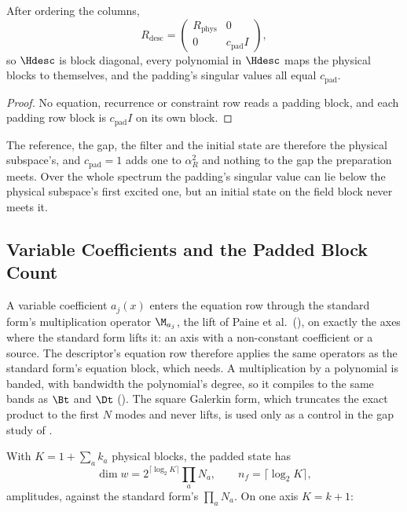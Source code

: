\begin{proposition}
\label{prop:padding-decouples}
After ordering the columns,
\begin{equation*}
    R_{\mathrm{desc}}=\begin{pmatrix}R_{\mathrm{phys}}&0\\0&c_{\mathrm{pad}}I\end{pmatrix},
\end{equation*}
so $\Hdesc$ is block diagonal, every polynomial in $\Hdesc$ maps the physical blocks to themselves, and the padding's singular values all equal $c_{\mathrm{pad}}$.
\end{proposition}
\begin{proof}
No equation, recurrence or constraint row reads a padding block, and each padding row block is $c_{\mathrm{pad}}I$ on its own block.
\end{proof}

The reference, the gap, the filter and the initial state are therefore the physical subspace's, and $c_{\mathrm{pad}}=1$ adds one to $\alpha_R^2$ and nothing to the gap the preparation meets. Over the whole spectrum the padding's singular value can lie below the physical subspace's first excited one, but an initial state on the field block never meets it.

\subsection{Variable Coefficients and the Padded Block Count}
\label{sec:app-variable-coeff}

A variable coefficient $a_j(x)$ enters the equation row through the standard form's multiplication operator $\M_{a_j}$, the lift of Paine et al.\ (), on exactly the axes where the standard form lifts it: an axis with a non-constant coefficient or a source. The descriptor's equation row therefore applies the same operators as the standard form's equation block, which  needs. A multiplication by a polynomial is banded, with bandwidth the polynomial's degree, so it compiles to the same bands as $\Bt$ and $\Dt$ (). The square Galerkin form, which truncates the exact product to the first $N$ modes and never lifts, is used only as a control in the gap study of .

With $K=1+\sum_ak_a$ physical blocks, the padded state has
\begin{equation}
    \dim w = 2^{\lceil\log_2K\rceil}\prod_aN_a,
    \qquad
    n_f=\lceil\log_2K\rceil ,
    \label{eq:app-padded-count}
\end{equation}
amplitudes, against the standard form's $\prod_aN_a$. On one axis $K=k+1$:

